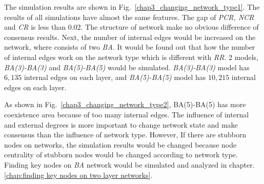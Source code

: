 The simulation results are shown in Fig.~\ref{chap3_changing_network_type1}. The results of all simulations have almost the same features. The gap of \textit{PCR, NCR} and \textit{CR} is less than 0.02. The structure of network make no obvious difference of consensus results. Next, the number of internal edges would be increased on the network, where consists of two \textit{BA}. It would be found out that how the number of internal edges work on the network type which is different with \textit{RR}. 2 models, \textit{BA(3)-BA(3)} and \textit{BA(5)-BA(5)} would be simulated. \textit{BA(3)-BA(3)} model has $6,135$ internal edges on each layer, and \textit{BA(5)-BA(5)} model has $10,215$ internal edges on each layer. 

As shown in Fig.~\ref{chap3_changing_network_type2}, BA(5)-BA(5) has more coexistence area because of too many internal edges. The influence of internal and external degrees is more important to change network state and make consensus than the influence of network type. However, If there are stubborn nodes on networks, the simulation results would be changed because node centrality of stubborn nodes would be changed according to network type. Finding key nodes on \textit{BA} network would be simulated and analyzed in chapter.\ref{chap:finding key nodes on two layer networks}.

